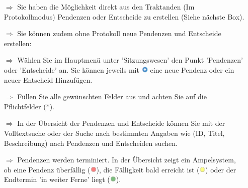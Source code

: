 \documentclass{article}
\begin{document}
\begin{multicols}{2}
\begin{tcolorbox}[colback=blue!5,colframe=blue!40!black,title=Pendenz- und Entscheid-Listen]
\begin{itemize}
  \item[$\Longrightarrow$] Sie haben die Möglichkeit direkt aus den Traktanden (Im Protokollmodus) Pendenzen oder Entscheide zu erstellen (Siehe nächste Box).
  \item[$\Longrightarrow$] Sie können zudem ohne Protokoll neue Pendenzen und Entscheide erstellen: 
  \item[$\Longrightarrow$] Wählen Sie im Hauptmenü unter 'Sitzungswesen' den Punkt 'Pendenzen' oder 'Entscheide' an. Sie können jeweils mit \includegraphics[height=9pt]{Icons/Plussymbol.jpg} eine neue Pendenz oder ein neuer Entscheid Hinzufügen.
  \item[$\Longrightarrow$] Füllen Sie alle gewünschten Felder aus und achten Sie auf die Pflichtfelder (*). 
	\item[$\Longrightarrow$] In der Übersicht der Pendenzen und Entscheide können Sie mit der Volltextsuche oder der Suche nach bestimmten Angaben wie (ID, Titel, Beschreibung) nach Pendenzen und Entscheiden suchen.
	\item[$\Longrightarrow$] Pendenzen werden terminiert. In der Übersicht zeigt ein Ampelsystem, ob eine Pendenz überfällig (\includegraphics[height=9pt]{Icons/PunktRot.jpg}), die Fälligkeit bald erreicht ist (\includegraphics[height=9pt]{Icons/PunktGelb.jpg}) oder der Endtermin  'in weiter Ferne' liegt (\includegraphics[height=9pt]{Icons/PunktGruen.jpg}).
\end{itemize}
\end{tcolorbox}


\end{multicols}


\end{document}
